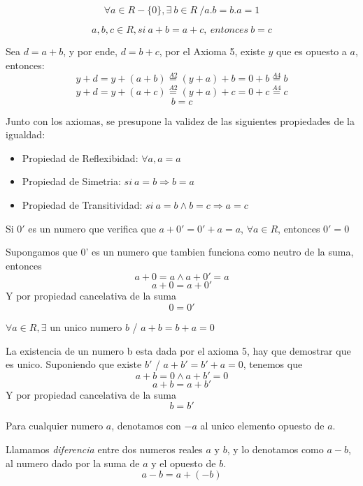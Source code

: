 \documentclass[10pt]{article}
\begin{document}
\begin{axiom}{}
$$\forall a \in R-\{0\}, \exists\ b \in R\ / a.b = b.a = 1$$
\end{axiom}

\begin{theo}{}
$$a,b,c \in R, si\ a+b = a+c,\ entonces\ b=c $$
\begin{prf}{}
Sea $d=a+b$, y por ende, $d=b+c$, por el Axioma 5, existe $y$ que es opuesto  a $a$, entonces:
$$y+d=y+(a+b) \overset{A2}{=} (y+a)+b = 0 + b \overset{A4}{=}b$$
$$y+d=y+(a+c) \overset{A2}{=} (y+a)+c = 0 + c \overset{A4}{=}c$$
$$b=c$$
\end{prf}
\end{theo}

\begin{data}{}
Junto con los axiomas, se presupone la validez de las siguientes propiedades de la igualdad:
\begin{itemize}
\item Propiedad de Reflexibidad: $\forall a, a=a$
\item Propiedad de Simetria: $si\ a=b \Rightarrow b=a$
\item Propiedad de Transitividad: $si\ a=b \land b=c \Rightarrow a=c$
\end{itemize}
\end{data}

\begin{cor}{}
Si $0'$ es un numero que verifica que $a+0' = 0'+a = a$, $\forall a \in R$, entonces $0' = 0$
\begin{prf}{}
Supongamos que 0' es un numero que tambien funciona como neutro de la suma, entonces
$$a+0=a \land a+0'=a$$
$$a+0=a+0'$$
Y por propiedad cancelativa de la suma
$$0=0'$$
\end{prf}
\end{cor}

\begin{cor}{}
$\forall a \in R, \exists$ un unico numero $b$ / $a+b=b+a =0$
\begin{prf}{}
La existencia de un numero b esta dada por el axioma 5, hay que demostrar que es unico. Suponiendo que existe $b'$ / $a+b'=b'+a=0$, tenemos que
$$a+b=0 \land a+b'=0$$
$$a+b = a+b'$$
Y por propiedad cancelativa de la suma
$$b=b'$$
\end{prf}
\end{cor}

Para cualquier numero $a$, denotamos con $-a$ al unico elemento opuesto de $a$.

\begin{data}{}
Llamamos \textit{diferencia} entre dos numeros reales $a$ y $b$, y lo denotamos como $a-b$, al numero dado por la suma de $a$ y el opuesto de $b$.
$$a-b = a+ (-b)$$
\end{data}
\end{document}
